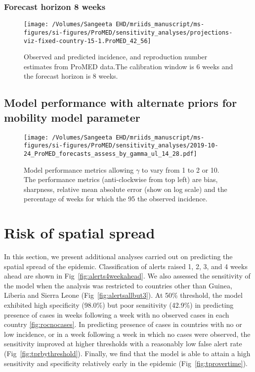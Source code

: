 \documentclass[9pt,twoside,lineno]{pnas-new}
\begin{document}
\subsubsection{Forecast horizon 8 weeks}\label{forecast-horizon-8-weeks-11}

\begin{figure}
    \centering
    \texttt{[image: /Volumes/Sangeeta EHD/mriids\_manuscript/ms-figures/si-figures/ProMED/sensitivity\_analyses/projections-viz-fixed-country-15-1.ProMED\_42\_56]} 
  \caption{Observed and predicted incidence, and reproduction number
    estimates from ProMED data.The calibration window is 6 weeks and
    the forecast horizon is 8 weeks.}
  \label{fig:pm68ul10}
\end{figure}\FloatBarrier


\subsection{Model performance with alternate priors for mobility
  model parameter}\label{model-performance-with-alternate-priors-for-mobility-model-parameter}

\begin{figure}
    \centering
    \texttt{[image: /Volumes/Sangeeta EHD/mriids\_manuscript/ms-figures/si-figures/ProMED/sensitivity\_analyses/2019-10-24\_ProMED\_forecasts\_assess\_by\_gamma\_ul\_14\_28.pdf]} 
  \caption{Model performance metrics allowing $\gamma$ to vary from
    1 to 2 or 10. The performance metrics (anti-clockwise from top left) are
    bias, sharpness, relative mean absolute error (show on log scale) and
    the percentage of weeks for which the 95%
    the observed incidence.}\label{fig:perfbygamma}
\end{figure}\FloatBarrier

\section{Risk of spatial spread}\label{sec:spatial-spread}

In this section, we present additional analyses carried out on
predicting the spatial spread of the epidemic. Classification of
alerts raised 1, 2, 3, and 4 weeks ahead are shown in
Fig~\ref{fig:alerts4weekahead}. We also assessed the sensitivity
of the model when the analysis was restricted to countries other than
Guinea, Liberia and Sierra Leone (Fig~\ref{fig:alertsallbut3}). At
50\% threshold, the
model exhibited high specificity (98.0\%) but poor sensitivity (42.9\%) in predicting 
presence of cases in weeks following a week with no observed cases in each
country \ref{fig:rocnocases}. In predicting presence of cases in
countries with no or low incidence, or in a
week following a week in which no cases were observed, the sensitivity
improved at higher thresholds with a reasonably low false alert rate
(Fig~\ref{fig:tprbythreshold}). Finally, we find that the model is
able to attain a high sensitivity and specificity relatively early in 
the epidemic (Fig~\ref{fig:tprovertime}).
 
\end{document}
